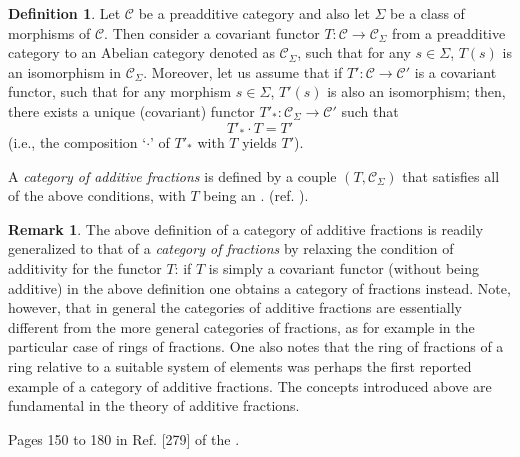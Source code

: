 \documentclass[12pt]{article}
\theoremstyle{plain}
\theoremstyle{definition}
\newtheorem{definition}{Definition}[section]
\newtheorem{remark}{Remark}[section]
\numberwithin{equation}{section}
\begin{document}
\begin{definition}
Let $\mathcal{C}$ be a preadditive category and also let $\Sigma$ be a class of morphisms of $\mathcal{C}$.
Then consider a covariant functor $T: \mathcal{C} \to \mathcal{C}_{\Sigma}$ from a preadditive category to
an Abelian category denoted as $\mathcal{C}_{\Sigma}$, such that for any $s \in \Sigma$, $T(s)$
is an isomorphism in $\mathcal{C}_{\Sigma}$. Moreover, let us assume that if $T': \mathcal{C} \to \mathcal{C}'$
is a covariant functor, such that for any morphism $s \in \Sigma$, $T'(s)$
is also an isomorphism; then, there exists a unique (covariant) functor $T'_* : \mathcal{C}_{\Sigma} \to \mathcal{C}'$ such that
$$T'_* \cdot T = T'$$ (i.e., the composition `$\cdot$' of $T'_*$ with $T$ yields $T'$).

A \emph{category of additive fractions} is defined by a couple $(T,\mathcal{C}_{\Sigma})$
that satisfies all of the above conditions, with $T$ being an 
. (ref. \cite{280}).
\end{definition}

\begin{remark}
The above definition of a category of additive fractions is readily generalized to
that of a \emph{category of fractions} by relaxing the condition of additivity 
for the functor $T$: if $T$ is simply a covariant functor (without being additive)
in the above definition one obtains a category of fractions instead. Note, however,
that in general the categories of additive fractions are essentially different from the
more general categories of fractions, as for example in the particular case of rings of fractions.
One also notes that the ring of fractions of a ring relative to a suitable system of elements was
perhaps the first reported example of a category of additive fractions. The concepts introduced 
above are fundamental in the theory of additive fractions. 
\end{remark}

\begin{thebibliography}{9}
Pages 150 to 180 in Ref. [279] of the 
.


\end{thebibliography}
\end{document}
